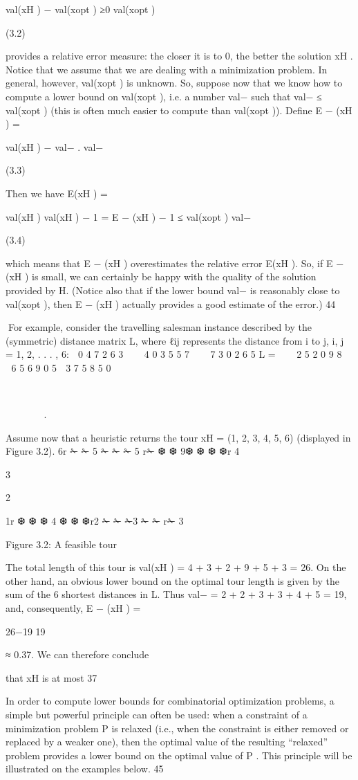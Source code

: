 \documentclass[titlepage]{book}
\theoremstyle{plain}
\theoremstyle{definition}
\theoremstyle{remark}
\begin{document}
val(xH ) − val(xopt )
≥0
val(xopt )

(3.2)

provides a relative error measure: the closer it is to 0, the better the solution xH . Notice that we assume
that we are dealing with a minimization problem.
In general, however, val(xopt ) is unknown. So, suppose now that we know how to compute a lower bound
on val(xopt ), i.e. a number val− such that val− ≤ val(xopt ) (this is often much easier to compute than
val(xopt )). Define
E − (xH ) =

val(xH ) − val−
.
val−

(3.3)

Then we have
E(xH ) =

val(xH )
val(xH )
− 1 = E − (xH )
−
1
≤
val(xopt )
val−

(3.4)

which means that E − (xH ) overestimates the relative error E(xH ). So, if E − (xH ) is small, we can
certainly be happy with the quality of the solution provided by H. (Notice also that if the lower bound
val− is reasonably close to val(xopt ), then E − (xH ) actually provides a good estimate of the error.)
44

For example, consider the travelling salesman instance described by the (symmetric) distance matrix L,
where ℓij represents the distance from i to j, i, j = 1, 2, . . . , 6:

0 4 7 2 6 3


 4 0 3 5 5 7


 7 3 0 2 6 5
L = 

 2 5 2 0 9 8


 6 5 6 9 0 5

3 7 5 8 5 0









.







Assume now that a heuristic returns the tour xH = (1, 2, 3, 4, 5, 6) (displayed in Figure 3.2).
6r
✁
✁
5 ✁
✁
✁
5 r✁
❆
❆
9❆
❆
❆
❆r
4

3

2

1r
❆
❆
❆ 4
❆
❆
❆r2
✁
✁
✁3
✁
✁
r✁
3

Figure 3.2: A feasible tour

The total length of this tour is val(xH ) = 4 + 3 + 2 + 9 + 5 + 3 = 26. On the other hand, an obvious
lower bound on the optimal tour length is given by the sum of the 6 shortest distances in L. Thus val−
= 2 + 2 + 3 + 3 + 4 + 5 = 19, and, consequently, E − (xH ) =

26−19
19

≈ 0.37. We can therefore conclude

that xH is at most 37%

In order to compute lower bounds for combinatorial optimization problems, a simple but powerful principle can often be used: when a constraint of a minimization problem P is relaxed (i.e., when the constraint
is either removed or replaced by a weaker one), then the optimal value of the resulting “relaxed” problem
provides a lower bound on the optimal value of P . This principle will be illustrated on the examples
below.
45
\end{document}
